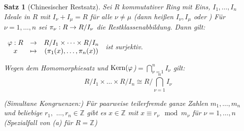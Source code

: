 \documentclass[a4paper,10pt,german]{scrbook}
\theoremstyle{saetze}
\newtheorem{Satz}{Satz}
\theoremstyle{definitionen}
\begin{document}
\begin{Satz}[Chinesischer Restsatz]
\label{Satz 8}
Sei $R$ kommutativer Ring mit Eins, $I_1,\dots,I_n$
Ideale in $R$ mit $I_\nu + I_\mu = R$ für alle $\nu \not= \mu$ (dann
heißen $I_\nu, I_\mu$  oder ) Für $\nu
= 1,\dots,n$ sei $\pi_\nu : R \rightarrow R/I_\nu$ die Restklassenabbildung.
Dann gilt:
\begin{enum}
\item $\begin{array}{ccc}\varphi: R &\rightarrow& R/I_1 \times \dots \times R/I_n \\
x &\mapsto& (\pi_1(x),\dots,\pi_n(x)) \end{array}$ ist surjektiv.

\item Wegen dem Homomorphiesatz und $\mathop{\rm Kern}\nolimits(\varphi$)$= \bigcap_{\nu=1}^n I_\nu$ gilt:
\[R/I_1 \times \dots \times R/I_n \cong R/\bigcap_{\nu=1}^n
I_\nu\]
\item (Simultane Kongruenzen:) \newline Für paarweise teilerfremde ganze
Zahlen $m_1,\dots,m_n$ und beliebige $r_1,$ $\dots,r_n \in
\mathbb{Z}$ gibt es $x \in \mathbb{Z}$ mit $x \equiv r_\nu \mod
m_\nu$ für $\nu = 1,\dots,n$ (Spezialfall von (a) für
$R=\mathbb{Z}$) \end{enum}
\end{Satz}
\end{document}
